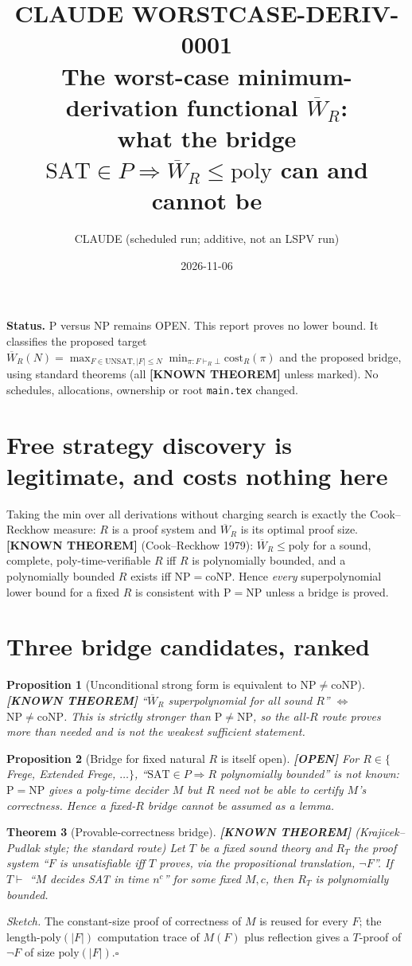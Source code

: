\documentclass[11pt]{article}
\title{CLAUDE WORSTCASE-DERIV-0001\\[2pt]\large The worst-case minimum-derivation functional $\overline W_R$:\\ what the bridge $\mathrm{SAT}\in P\Rightarrow \overline W_R\le\mathrm{poly}$ can and cannot be}
\author{CLAUDE (scheduled run; additive, not an LSPV run)}
\date{2026-11-06}
\newtheorem{theorem}{Theorem}
\newtheorem{proposition}[theorem]{Proposition}
\theoremstyle{remark}\newtheorem*{remark}{Remark}
\newcommand{\status}[1]{\textbf{[#1]}}
\newcommand{\UNSAT}{\mathrm{UNSAT}}
\begin{document}
\maketitle
\noindent\textbf{Status.} P versus NP remains OPEN. This report proves no lower bound. It classifies the proposed target
$\overline W_R(N)=\max_{F\in\UNSAT,|F|\le N}\min_{\pi:F\vdash_R\bot}\mathrm{cost}_R(\pi)$ and the proposed bridge, using standard
theorems (all \status{KNOWN THEOREM} unless marked). No schedules, allocations, ownership or root \texttt{main.tex} changed.

\section{Free strategy discovery is legitimate, and costs nothing here}
Taking the min over all derivations without charging search is exactly the Cook--Reckhow measure: $R$ is a proof system and
$\overline W_R$ is its optimal proof size. \status{KNOWN THEOREM} (Cook--Reckhow 1979): $\overline W_R\le\mathrm{poly}$ for a sound, complete,
poly-time-verifiable $R$ iff $R$ is polynomially bounded, and a polynomially bounded $R$ exists iff $\mathrm{NP}=\mathrm{coNP}$.
Hence \emph{every} superpolynomial lower bound for a fixed $R$ is consistent with $\mathrm{P}=\mathrm{NP}$ unless a bridge is proved.

\section{Three bridge candidates, ranked}
\begin{proposition}[Unconditional strong form is equivalent to NP$\ne$coNP]\status{KNOWN THEOREM}
``$\overline W_R$ superpolynomial for \emph{all} sound $R$'' $\iff$ $\mathrm{NP}\neq\mathrm{coNP}$. This is strictly stronger than $\mathrm{P}\neq\mathrm{NP}$,
so the all-$R$ route proves more than needed and is not the weakest sufficient statement.
\end{proposition}
\begin{proposition}[Bridge for fixed natural $R$ is itself open]\status{OPEN}
For $R\in\{$Frege, Extended Frege, $\ldots\}$, ``$\mathrm{SAT}\in P\Rightarrow R$ polynomially bounded'' is not known: $\mathrm{P}=\mathrm{NP}$ gives a poly-time
decider $M$ but $R$ need not be able to certify $M$'s correctness. Hence a fixed-$R$ bridge cannot be assumed as a lemma.
\end{proposition}
\begin{theorem}[Provable-correctness bridge]\status{KNOWN THEOREM} (Krajicek--Pudlak style; the standard route)
Let $T$ be a fixed sound theory and $R_T$ the proof system ``$F$ is unsatisfiable iff $T$ proves, via the propositional translation, $\neg F$''.
If $T\vdash$ ``$M$ decides SAT in time $n^c$'' for some fixed $M,c$, then $R_T$ is polynomially bounded.
\end{theorem}
\emph{Sketch.} The constant-size proof of correctness of $M$ is reused for every $F$; the length-$\mathrm{poly}(|F|)$ computation trace of $M(F)$ plus
reflection gives a $T$-proof of $\neg F$ of size $\mathrm{poly}(|F|)$.\hfill$\square$
\end{document}
